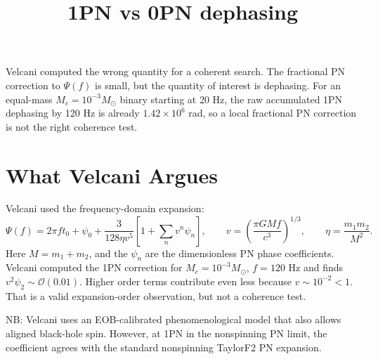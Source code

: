 \documentclass[11pt]{article}
\title{1PN vs 0PN dephasing}
\author{}
\date{}
\begin{document}
\maketitle

Velcani computed the wrong quantity for a coherent search. The fractional PN
correction to $\Psi(f)$ is small, but the quantity of interest is dephasing. For an
equal-mass $M_c=10^{-3}M_\odot$ binary starting at 20 Hz, the raw accumulated
1PN dephasing by 120 Hz is already $1.42\times10^6$ rad, so a local fractional
PN correction is not the right coherence test.

\section{What Velcani Argues}

Velcani used the frequency-domain expansion:
\begin{equation}
    \Psi(f)
    =
    2\pi f t_0 + \psi_0
    + \frac{3}{128\eta v^5}
      \left[1 + \sum_n v^n \psi_n \right],
    \qquad
    v=\left(\frac{\pi G M f}{c^3}\right)^{1/3},
    \qquad
    \eta=\frac{m_1m_2}{M^2}.
    \label{eq:velcani_pn_phase}
\end{equation}
Here $M=m_1+m_2$, and the $\psi_n$ are the dimensionless PN phase
coefficients. Velcani computed the 1PN correction for
$M_c = 10^{-3}M_\odot$, $f=120$ Hz and finds $v^2 \psi_2\sim \mathcal{O}(0.01)$. Higher order terms contribute 
even less because $v \sim 10^{-2} < 1$.
That is a valid expansion-order observation, but not a coherence test.

NB: Velcani uses an EOB-calibrated phenomenological model that also
allows aligned black-hole spin. However, at 1PN in the nonspinning PN limit,
the coefficient agrees with the standard nonspinning TaylorF2 PN expansion. 
\end{document}
